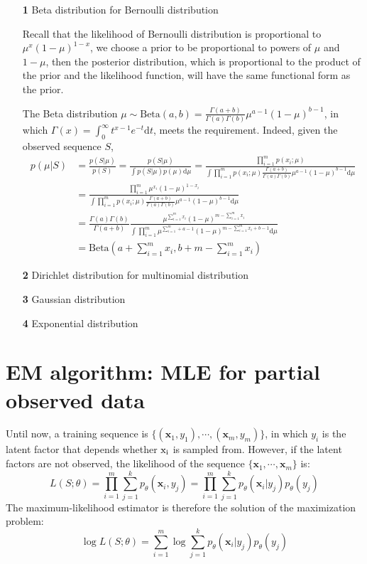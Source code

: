 \documentclass{article}
\begin{document}
	\begin{itemize}
	\item [\textbf{1}] Beta distribution for Bernoulli distribution
	
	Recall that the likelihood of Bernoulli distribution is proportional to $\mu^x (1-\mu)^{1-x}$,	we choose a prior to be proportional to powers of $\mu$ and $1-\mu$, then the posterior distribution, which is proportional to the product of the prior and the likelihood function, will have the same functional form as the prior.
	
	The Beta distribution $\mu\sim \mathrm{Beta}(a,b)=\frac{\Gamma(a+b)}{\Gamma(a)\Gamma(b)}\mu^{a-1}(1-\mu)^{b-1}$, in which $\Gamma(x)=\int^\infty_0 t^{x-1} e^{-t} \mathrm{d} t$, meets the requirement. Indeed, given the observed sequence $S$, 
	\begin{equation*}
	\begin{split}
	p(\mu|S) &= \frac{p(S|\mu)}{p(S)}=\frac{p(S|\mu)}{\int p(S|\mu)p(\mu) \mathrm{d} \mu}
	= \frac{\prod_{i=1}^m p(x_i;\mu)}{\int \prod_{i=1}^m p(x_i;\mu)\frac{\Gamma(a+b)}{\Gamma(a)\Gamma(b)}\mu^{a-1}(1-\mu)^{b-1} \mathrm{d} \mu} \\
	&= \frac{\prod_{i=1}^m \mu^{x_i} (1-\mu)^{1-x_i}}{\int \prod_{i=1}^m p(x_i;\mu)\frac{\Gamma(a+b)}{\Gamma(a)\Gamma(b)}\mu^{a-1}(1-\mu)^{b-1} \mathrm{d} \mu} \\
	&= \frac{\Gamma(a)\Gamma(b)}{\Gamma(a+b)} \frac{\mu^{\sum_{i=1}^m x_i} (1-\mu)^{m-\sum_{i=1}^m x_i}}{\int \prod_{i=1}^m \mu^{\sum_{i=1}^m+a-1} (1-\mu)^{m-\sum_{i=1}^m x_i +b-1} \mathrm{d} \mu} \\
	&= \mathrm{Beta}(a+\sum_{i=1}^m x_i, b+m-\sum_{i=1}^m x_i)
	\end{split}
	\end{equation*}
	
	\item [\textbf{2}] Dirichlet distribution for multinomial distribution
	\item [\textbf{3}] Gaussian distribution
	\item [\textbf{4}] Exponential distribution
	\end{itemize}
	
\section{EM algorithm: MLE for partial observed data}
	Until now, a training sequence is $\{(\bm{x}_1,y_1),\cdots,(\bm{x}_m,y_m)\}$, in which $y_i$ is the latent factor that depends whether $\rm{x}_i$ is sampled from. However, if the latent factors are not observed, the likelihood of the sequence $\{\bm{x}_1,\cdots,\bm{x}_m\}$ is:
	\begin{equation*}
	L(S;\theta) = \prod_{i=1}^m \sum_{j=1}^k p_\theta(\bm{x}_i,y_j) = \prod_{i=1}^m \sum_{j=1}^k p_\theta(\bm{x}_i|y_j)p_\theta(y_j)
	\end{equation*}
	The maximum-likelihood estimator is therefore the solution of the maximization problem:
	\begin{equation}
	\log L(S;\theta) = \sum_{i=1}^m \log \sum_{j=1}^k p_\theta(\bm{x}_i|y_j)p_\theta(y_j)
	\end{equation}
	
\end{document}

